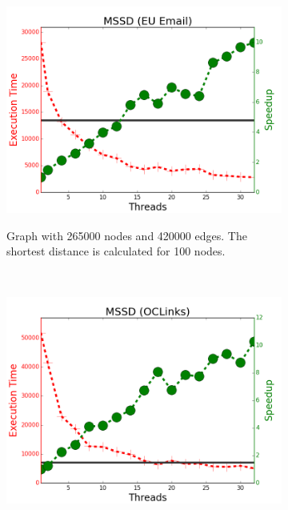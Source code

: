 \begin{figure}[]
        \centering
        \begin{subfigure}[b]{\plotsize\textwidth}
                \includegraphics[width=\textwidth]{experiments/scalability/scale-shortest-email.png}
                \label{fig:implementation:scale_sssp_email}
                \caption{Graph with 265000 nodes and 420000 edges. The shortest
                distance is calculated for 100 nodes.}
        \end{subfigure}
        ~
        \begin{subfigure}[b]{\plotsize\textwidth}
                \includegraphics[width=\textwidth]{experiments/scalability/scale-shortest-oclinks.png}
                \label{fig:implementation:scale_sssp_oclinks}

\end{subfigure}
\end{figure}
